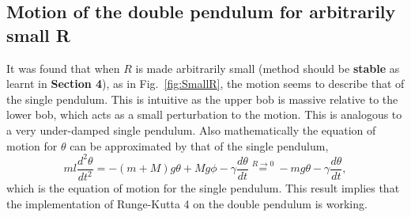 \documentclass[10pt,a4paper]{article}
\begin{document}
\subsection{Motion of the double pendulum for arbitrarily small R}
It was found that when $R$ is made arbitrarily small (method should be \textbf{stable} as learnt in \textbf{Section 4}), as in Fig.~\ref{fig:SmallR}, the motion seems to describe that of the single pendulum. This is intuitive as the upper bob is massive relative to the lower bob, which acts as a small perturbation to the motion. This is analogous to a very under-damped single pendulum. Also mathematically the equation of motion for $\theta$ can be approximated by that of the single pendulum,
\begin{equation}
ml\frac{d^2\theta}{dt^2}=-(m+M)g\theta+Mg\phi-\gamma\frac{d\theta}{dt}\stackrel{R\to0}{=}-mg\theta-\gamma\frac{d\theta}{dt},
\end{equation}
which is the equation of motion for the single pendulum. This result implies that the implementation of Runge-Kutta 4 on the double pendulum is working.
\end{document}
